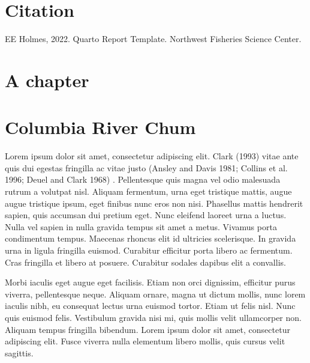 \documentclass[
  letterpaper,
  oneside,
  open=any]{scrbook}
\renewcommand*\contentsname{Table of contents}
\newcommand\contentsname{Table of contents}
\begin{document}
\renewcommand*\contentsname{Table of contents}
{
\setcounter{tocdepth}{1}
\tableofcontents
}
\listoffigures
\listoftables
\mainmatter
{}

\chapter*{Citation}\label{citation}


EE Holmes, 2022. Quarto Report Template. Northwest Fisheries Science
Center.


\chapter{A chapter}\label{a-chapter}


\chapter{Columbia River Chum}\label{columbia-river-chum}

Lorem ipsum dolor sit amet, consectetur adipiscing elit. Clark (1993)
vitae ante quis dui egestas fringilla ac vitae justo (Ansley and Davis
1981; Collins et al. 1996; Deuel and Clark 1968) . Pellentesque quis
magna vel odio malesuada rutrum a volutpat nisl. Aliquam fermentum, urna
eget tristique mattis, augue augue tristique ipsum, eget finibus nunc
eros non nisi. Phasellus mattis hendrerit sapien, quis accumsan dui
pretium eget. Nunc eleifend laoreet urna a luctus. Nulla vel sapien in
nulla gravida tempus sit amet a metus. Vivamus porta condimentum tempus.
Maecenas rhoncus elit id ultricies scelerisque. In gravida urna in
ligula fringilla euismod. Curabitur efficitur porta libero ac fermentum.
Cras fringilla et libero at posuere. Curabitur sodales dapibus elit a
convallis.

Morbi iaculis eget augue eget facilisis. Etiam non orci dignissim,
efficitur purus viverra, pellentesque neque. Aliquam ornare, magna ut
dictum mollis, nunc lorem iaculis nibh, eu consequat lectus urna euismod
tortor. Etiam ut felis nisl. Nunc quis euismod felis. Vestibulum gravida
nisi mi, quis mollis velit ullamcorper non. Aliquam tempus fringilla
bibendum. Lorem ipsum dolor sit amet, consectetur adipiscing elit. Fusce
viverra nulla elementum libero mollis, quis cursus velit sagittis.
\end{document}
